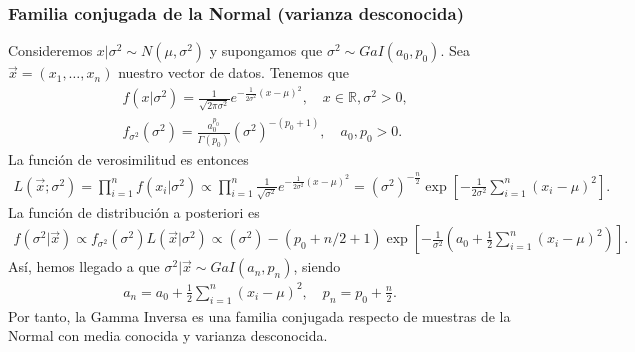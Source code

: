 \subsubsection{Familia conjugada de la Normal (varianza desconocida)}
\noindent Consideremos $x | \sigma^2 \sim N(\mu,\sigma^2)$ y supongamos que $\sigma^2 \sim GaI(a_0,p_0)$. Sea $\vec{x} = (x_1,\ldots,x_n)$ nuestro vector de datos. Tenemos que
\begin{align*}
    &f(x | \sigma^2) = \frac{1}{\sqrt{2\pi \sigma^2}} e^{- \frac{1}{2\sigma^2}(x -\mu)^2}, \quad x \in \mathbb{R}, \sigma^2 > 0, \\
    & f_{\sigma^2}(\sigma^2) = \frac{a_0^{p_0}}{\Gamma(p_0)} \left(\sigma^2\right)^{-(p_0+1)}, \quad a_0,p_0 > 0.
\end{align*}
La función de verosimilitud es entonces
\begin{align*}
    L(\vec{x}; \sigma^2) =  \prod_{i=1}^{n} f(x_i | \sigma^2) \propto \prod_{i=1}^{n} \frac{1}{\sqrt{\sigma^2}} e^{- \frac{1}{2\sigma^2}(x -\mu)^2} = \left(\sigma^2 \right)^{-\frac{n}{2}} \exp\left[ - \frac{1}{2\sigma^2} \sum_{i=1}^{n} (x_i - \mu)^2 \right].
\end{align*}
La función de distribución a posteriori es
\begin{align*}
     f(\sigma^2 | \vec{x}) \propto f_{\sigma^2}(\sigma^2) L(\vec{x} | \sigma^2) \propto \left(\sigma^2 \right)-(p_0 + n/2 + 1) \exp\left[- \frac{1}{\sigma^2}\left( a_0 + \frac{1}{2} \sum_{i=1}^{n} (x_i - \mu)^2\right)\right].
\end{align*}
Así, hemos llegado a que $\sigma^2 | \vec{x} \sim GaI(a_n,p_n)$, siendo
\begin{align*}
    a_n = a_0 + \frac{1}{2} \sum_{i=1}^{n} (x_i - \mu)^2, \quad p_n = p_0 + \frac{n}{2}.
\end{align*}
Por tanto, la Gamma Inversa es una familia conjugada respecto de muestras de la Normal con media conocida y varianza desconocida.

